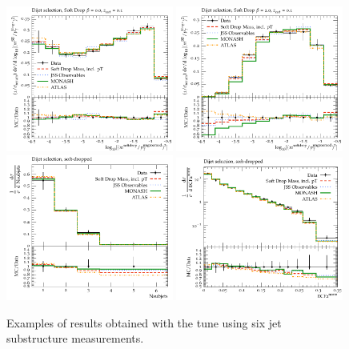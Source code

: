 \begin{figure}
\begin{center}
\includegraphics[width=0.49\textwidth]{figs/RivetPlotsFinal/SoftDropMass/d01-x01-y01.pdf} \hfill
\includegraphics[width=0.49\textwidth]{figs/RivetPlotsFinal/SoftDropMass/d03-x01-y01.pdf} \hfill
\includegraphics[width=0.49\textwidth]{figs/RivetPlotsFinal/ATLAS_2019_I1724098/d23-x01-y01.pdf} \hfill
\includegraphics[width=0.49\textwidth]{figs/RivetPlotsFinal/ATLAS_2019_I1724098/d27-x01-y01.pdf} \hfill
\end{center}
\caption{Examples of results obtained with the tune using six jet substructure measurements.}\label{allTune}
\end{figure}



